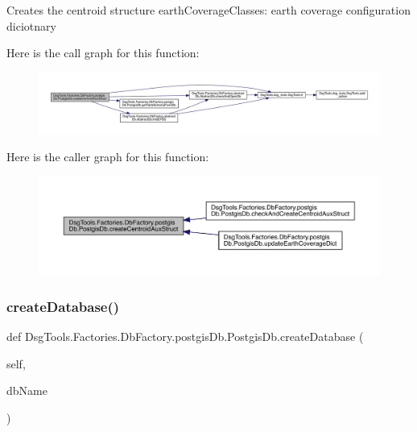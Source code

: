 \begin{DoxyVerb}Creates the centroid structure
earthCoverageClasses: earth coverage configuration diciotnary
\end{DoxyVerb}
 Here is the call graph for this function\+:
\nopagebreak
\begin{figure}[H]
\begin{center}
\leavevmode
\includegraphics[width=350pt]{class_dsg_tools_1_1_factories_1_1_db_factory_1_1postgis_db_1_1_postgis_db_a36cb595dec4d566e10994f2edc227621_cgraph}
\end{center}
\end{figure}
Here is the caller graph for this function\+:
\nopagebreak
\begin{figure}[H]
\begin{center}
\leavevmode
\includegraphics[width=350pt]{class_dsg_tools_1_1_factories_1_1_db_factory_1_1postgis_db_1_1_postgis_db_a36cb595dec4d566e10994f2edc227621_icgraph}
\end{center}
\end{figure}
\mbox{\label{class_dsg_tools_1_1_factories_1_1_db_factory_1_1postgis_db_1_1_postgis_db_aecdf533d27f0820aa5caa706b1f89cf0}} 
\subsubsection{\texorpdfstring{create\+Database()}{createDatabase()}}
{\footnotesize\ttfamily def Dsg\+Tools.\+Factories.\+Db\+Factory.\+postgis\+Db.\+Postgis\+Db.\+create\+Database (\begin{DoxyParamCaption}\item[{}]{self,  }\item[{}]{db\+Name }\end{DoxyParamCaption})}

